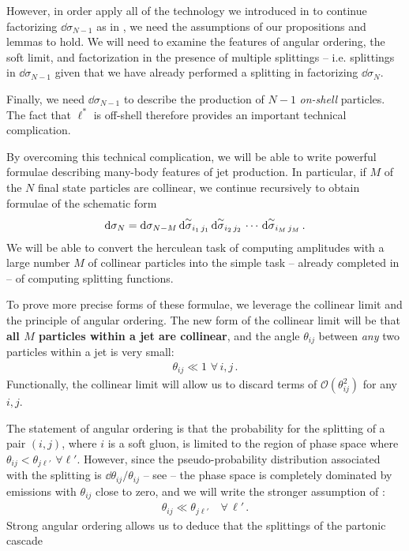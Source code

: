 However, in order apply all of the technology we introduced in  to continue factorizing \(\dd\sigma_{N-1}\) as in , we need the assumptions of our propositions and lemmas to hold.
%
We will need to examine the features of angular ordering, the soft limit, and factorization in the presence of multiple splittings -- i.e. splittings in \(\dd \sigma_{N-1}\) given that we have already performed a splitting in factorizing \(\dd\sigma_N\).

Finally, we need \(\dd\sigma_{N-1}\) to describe the production of \(N-1\) \textit{on-shell} particles.
%
The fact that \(\ell^*\) is off-shell therefore provides an important technical complication.


By overcoming this technical complication, we will be able to write powerful formulae describing many-body features of jet production.
%
In particular, if \(M\) of the \(N\) final state particles are collinear, we continue recursively to obtain formulae of the schematic form
\begin{align}
    \label{eq:schematic-recursion}
    \dd \sigma_N
    =
    \dd \sigma_{N-M}
    \,
    \dsigmatilde_{i_1 \, j_1}
    \,
    \dsigmatilde_{i_2 \, j_2}
    \,
    \cdots
    \,
    \dsigmatilde_{i_M \, j_M}
    \,.
\end{align}
We will be able to convert the herculean task of computing amplitudes with a large number \(M\) of collinear particles into the simple task -- already completed in  -- of computing splitting functions.


To prove more precise forms of these formulae, we leverage the collinear limit and the principle of angular ordering.
%
The new form of the collinear limit will be that \textbf{all \(M\) particles within a jet are collinear}, and the angle \(\theta_{ij}\) between \textit{any} two particles within a jet is very small:
\begin{align}
    \theta_{ij} \ll 1\,\,\forall \, i, j
    \,.
\end{align}
%
Functionally, the collinear limit will allow us to discard terms of \(\mathcal{O}(\theta_{ij}^2)\) for any \(i,j\).

The statement of angular ordering is that the probability for the splitting of a pair \((i,j)\), where \(i\) is a soft gluon, is limited to the region of phase space where \(\theta_{ij} < \theta_{j\ell'}\,\, \forall \ell'\).
%
However, since the pseudo-probability distribution associated with the splitting is \(\dd\theta_{ij}/\theta_{ij}\) -- see  -- the phase space is completely dominated by emissions with \(\theta_{ij}\) close to zero, and we will write the stronger assumption of :
\begin{align}
    \theta_{ij} \ll \theta_{j \ell'} \quad \forall \, \ell'
    \,.
\end{align}
Strong angular ordering allows us to deduce that the splittings of the partonic cascade

